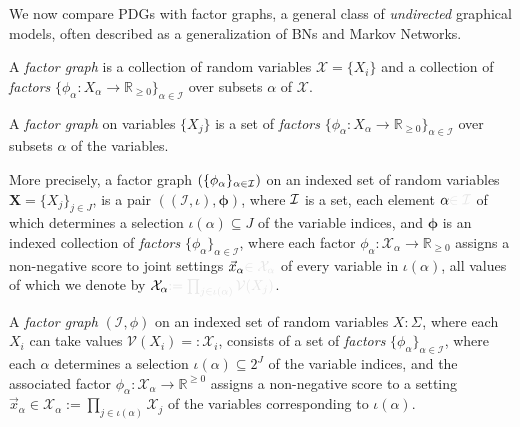 \documentclass{article}
\newcommand{\notation}[2][]{#1}
\renewcommand{\notation}[2][]{{\color{notationcolor} #2}}
\newcommand{\V}{\mathcal V}
\numberwithin{equation}{section}
\begin{document}
	
	
	We now compare PDGs with factor graphs, a general class of \emph{undirected} graphical models, often described as a generalization of BNs and Markov Networks.
	
	
\begin{quickdefn}
	A \emph{factor graph} is a collection of random variables $\mathcal X = \{X_i\}$ and a collection of \emph{factors} $\{\phi_\alpha\colon X_\alpha \to \mathbb R_{\geq0}\}_{\alpha \in \mathcal I }$ over subsets $\alpha$ of $\mathcal X$.
\end{quickdefn}
	\begin{defn}
		A \emph{factor graph} on variables $\{X_j\}$ is a set of \emph{factors} $\{\phi_\alpha\colon X_\alpha \to \mathbb R_{\geq0}\}_{\alpha \in \mathcal I }$ over subsets $\alpha$ of the variables.
		
		More precisely, a factor graph $ (\{\phi_\alpha\}_{\alpha \in \cal I})$ on an indexed set of random variables $\mathbf X = \{ X_j \}_{j \in J}$, 
		is a pair $((\mathcal I,\iota), \boldsymbol\phi)$, where $\cal I$ is a set,
		each element $\alpha\notation{\in \mathcal I}$ of which determines a selection $\iota(\alpha) \subseteq J$ of the variable indices, and
		$\boldsymbol\phi$ is an indexed collection of \emph{factors} $\{\phi_\alpha\}_{\alpha \in \mathcal I }$, 
		where each factor $\phi_\alpha \colon \mathcal X_\alpha \to \mathbb R_{\geq 0}$ assigns a non-negative score to joint settings $\vec x_\alpha \notation{\in \mathcal X_\alpha}$ of every variable in $\iota(\alpha)$, all values of which we denote by $\mathcal X_\alpha\notation{ := \prod_{j \in \iota(\alpha)} \mathcal V(X_j)}$. 
	\end{defn}
\begin{fulldefn}
	A \emph{factor graph} $(\mathcal I, \phi)$ on an indexed set of random variables $X : \Sigma_{}$, where each $X_i$ can take values $\V(X_i) =: \mathcal X_i$, consists of  
	a set of \emph{factors} $\{\phi_\alpha\}_{\alpha \in \mathcal I }$, where each $\alpha$ determines a selection $\iota(\alpha) \subseteq 2^J$ of the variable indices, and the associated factor $\phi_\alpha \colon \mathcal X_\alpha \to \mathbb R^{\geq 0}$ assigns a non-negative score to a setting
	$\vec x_\alpha \in \mathcal X_\alpha := \prod_{j \in \iota(\alpha)} \mathcal X_j$ of the variables corresponding to $\iota(\alpha)$.
	
\end{fulldefn}
\end{document}
